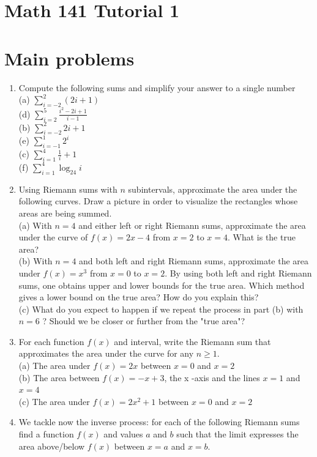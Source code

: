 \documentclass[10pt]{article}
\begin{document}
\section*{Math 141 Tutorial 1}
\section*{Main problems}
\begin{enumerate}
  \item Compute the following sums and simplify your answer to a single number\\
(a) $\sum_{i=-2}^{2}(2 i+1)$\\
(d) $\sum_{i=2}^{5} \frac{i^{2}-2 i+1}{i-1}$\\
(b) $\sum_{i=-2}^{2} 2 i+1$\\
(e) $\sum_{i=-1}^{1} 2^{i}$\\
(c) $\sum_{i=1}^{4} \frac{1}{i}+1$\\
(f) $\sum_{i=1}^{4} \log _{24} i$
  \item Using Riemann sums with $n$ subintervals, approximate the area under the following curves. Draw a picture in order to visualize the rectangles whose areas are being summed.\\
(a) With $n=4$ and either left or right Riemann sums, approximate the area under the curve of $f(x)=2 x-4$ from $x=2$ to $x=4$. What is the true area?\\
(b) With $n=4$ and both left and right Riemann sums, approximate the area under $f(x)=x^{3}$ from $x=0$ to $x=2$. By using both left and right Riemann sums, one obtains upper and lower bounds for the true area. Which method gives a lower bound on the true area? How do you explain this?\\
(c) What do you expect to happen if we repeat the process in part (b) with $n=6$ ? Should we be closer or further from the "true area"?
  \item For each function $f(x)$ and interval, write the Riemann sum that approximates the area under the curve for any $n \geq 1$.\\
(a) The area under $f(x)=2 x$ between $x=0$ and $x=2$\\
(b) The area between $f(x)=-x+3$, the x -axis and the lines $x=1$ and $x=4$\\
(c) The area under $f(x)=2 x^{2}+1$ between $x=0$ and $x=2$
  \item We tackle now the inverse process: for each of the following Riemann sums find a function $f(x)$ and values $a$ and $b$ such that the limit expresses the area above/below $f(x)$ between $x=a$ and $x=b$.
\end{enumerate}
\end{document}
